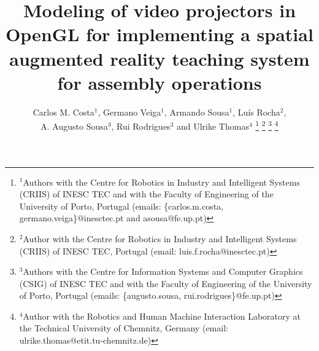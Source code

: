 









\title{\LARGE \bf
Modeling of video projectors in OpenGL for implementing a spatial augmented reality teaching system for assembly operations
}

\author{Carlos M. Costa$^{1}$, Germano Veiga$^{1}$, Armando Sousa$^{1}$, Luís Rocha$^{2}$,\\A. Augusto Sousa$^{3}$, Rui Rodrigues$^{3}$ and Ulrike Thomas$^{4}$%
\thanks{$^{1}$Authors with the Centre for Robotics in Industry and Intelligent Systems (CRIIS) of INESC TEC and with the Faculty of Engineering of the University of Porto, Portugal (emails: \{carlos.m.costa, germano.veiga\}@inesctec.pt and asousa@fe.up.pt)}%
\thanks{$^{2}$Author with the Centre for Robotics in Industry and Intelligent Systems (CRIIS) of INESC TEC, Portugal (email: luis.f.rocha@inesctec.pt)}%
\thanks{$^{3}$Authors with the Centre for Information Systems and Computer Graphics (CSIG) of INESC TEC and with the Faculty of Engineering of the University of Porto, Portugal (emails: \{augusto.sousa, rui.rodrigues\}@fe.up.pt)}%
\thanks{$^{4}$Author with the Robotics and Human Machine Interaction Laboratory at the Technical University of Chemnitz, Germany (email: ulrike.thomas@etit.tu-chemnitz.de)}%
}


\maketitle



















